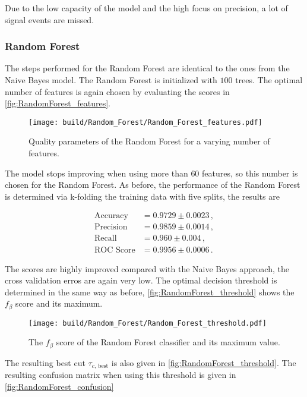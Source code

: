 Due to the low capacity of the model and the high focus on precision, a lot of signal events are missed.

\subsubsection{Random Forest}

The steps performed for the Random Forest are identical to the ones from the Naive Bayes model.
The Random Forest is initialized with $100$ trees.
The optimal number of features is again chosen by evaluating the scores in
\autoref{fig:RandomForest_features}.

\begin{figure}[H]
  \centering
  \texttt{[image: build/Random\_Forest/Random\_Forest\_features.pdf]}
  \caption{Quality parameters of the Random Forest for a varying number of features.}
  \label{fig:RandomForest_features}
\end{figure}

The model stops improving when using more than $60$ features, so this number is chosen for the Random Forest.
As before, the performance of the Random Forest is determined via k-folding the training data
with five splits, the results are

\begin{align*}
  \text{Accuracy} &= 0.9729\pm0.0023 \,, \\
  \text{Precision} &= 0.9859\pm0.0014 \,, \\
  \text{Recall} &= 0.960\pm0.004 \,, \\
  \text{ROC Score} &= 0.9956\pm0.0006 \,.
\end{align*}

The scores are highly improved compared with the Naive Bayes approach, the cross validation erros are again very low.
The optimal decision threshold is determined in the same way as before, \autoref{fig:RandomForest_threshold}
shows the $f_\beta$ score and its maximum.

\begin{figure}[H]
  \centering
  \texttt{[image: build/Random\_Forest/Random\_Forest\_threshold.pdf]}
  \caption{The $f_\beta$ score of the Random Forest classifier and its maximum value.}
  \label{fig:RandomForest_threshold}
\end{figure}

The resulting best cut $\tau_{c \text{, best}}$ is also given in \autoref{fig:RandomForest_threshold}. The resulting confusion matrix 
when using this threshold is given in \autoref{fig:RandomForest_confusion}

